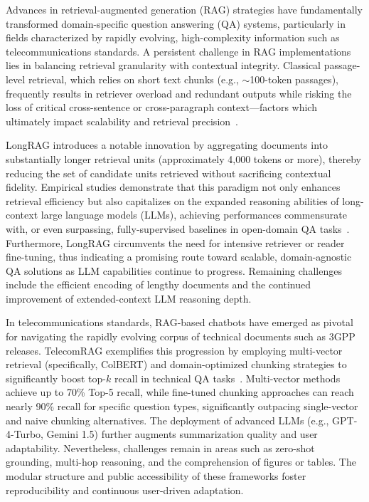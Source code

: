 \documentclass[sigconf]{acmart}
\begin{document}
Advances in retrieval-augmented generation (RAG) strategies have fundamentally transformed domain-specific question answering (QA) systems, particularly in fields characterized by rapidly evolving, high-complexity information such as telecommunications standards. A persistent challenge in RAG implementations lies in balancing retrieval granularity with contextual integrity. Classical passage-level retrieval, which relies on short text chunks (e.g., \(\sim\)100-token passages), frequently results in retriever overload and redundant outputs while risking the loss of critical cross-sentence or cross-paragraph context---factors which ultimately impact scalability and retrieval precision~\cite{ref34}.

LongRAG introduces a notable innovation by aggregating documents into substantially longer retrieval units (approximately 4,000 tokens or more), thereby reducing the set of candidate units retrieved without sacrificing contextual fidelity. Empirical studies demonstrate that this paradigm not only enhances retrieval efficiency but also capitalizes on the expanded reasoning abilities of long-context large language models (LLMs), achieving performances commensurate with, or even surpassing, fully-supervised baselines in open-domain QA tasks~\cite{ref34}. Furthermore, LongRAG circumvents the need for intensive retriever or reader fine-tuning, thus indicating a promising route toward scalable, domain-agnostic QA solutions as LLM capabilities continue to progress. Remaining challenges include the efficient encoding of lengthy documents and the continued improvement of extended-context LLM reasoning depth.

In telecommunications standards, RAG-based chatbots have emerged as pivotal for navigating the rapidly evolving corpus of technical documents such as 3GPP releases. TelecomRAG exemplifies this progression by employing multi-vector retrieval (specifically, ColBERT) and domain-optimized chunking strategies to significantly boost top-\(k\) recall in technical QA tasks~\cite{ref20}. Multi-vector methods achieve up to 70\% Top-5 recall, while fine-tuned chunking approaches can reach nearly 90\% recall for specific question types, significantly outpacing single-vector and naive chunking alternatives. The deployment of advanced LLMs (e.g., GPT-4-Turbo, Gemini 1.5) further augments summarization quality and user adaptability. Nevertheless, challenges remain in areas such as zero-shot grounding, multi-hop reasoning, and the comprehension of figures or tables. The modular structure and public accessibility of these frameworks foster reproducibility and continuous user-driven adaptation.
\end{document}
